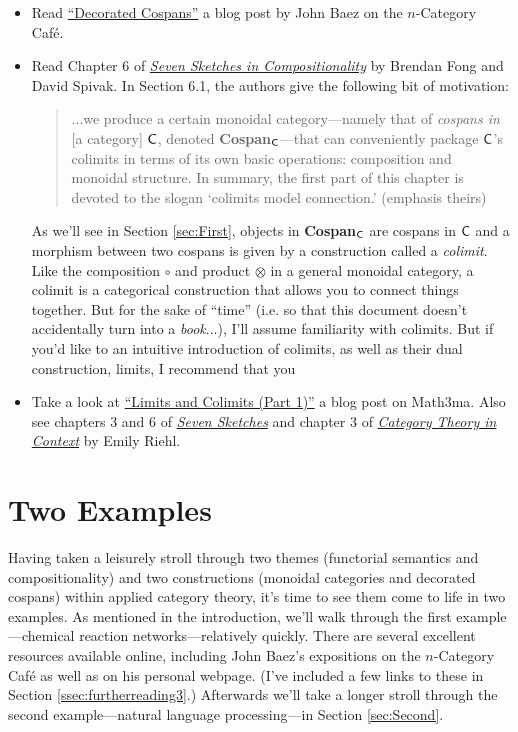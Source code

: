 \documentclass{tufte-handout-tai}
\newcommand{\cat}[1]{{\normalfont\textsf{#1}}}
\theoremstyle{plain}
\theoremstyle{definition}
\theoremstyle{remark}
\begin{document}
\begin{itemize}
	\item Read \href{https://golem.ph.utexas.edu/category/2016/01/decorated_cospans.html}{``Decorated Cospans''} a blog post by John Baez on the $n$-Category Caf{\'e}.
	\item Read Chapter 6 of \href{https://arxiv.org/pdf/1803.05316.pdf}{\textit{Seven Sketches in Compositionality}} by Brendan Fong and David Spivak. In Section 6.1, the authors give the following bit of motivation:
		\begin{quote}
		...we produce a certain monoidal category---namely that of \textit{cospans in} [a category] $\cat{C}$, denoted \textbf{Cospan}$_\cat{C}$---that can conveniently package $\cat{C}$'s colimits in terms of its own basic operations: composition and monoidal structure. In summary, the first part of this chapter is devoted to the slogan `colimits model connection.' (emphasis theirs)
		\end{quote}
	As we'll see in Section \ref{sec:First}, objects in \textbf{Cospan}$_\cat{C}$ are cospans in $\cat{C}$ and a morphism between two cospans is given by a construction called a \textit{colimit}. Like the composition $\circ$ and product $\otimes$ in a general monoidal category, a colimit is a categorical construction that allows you to connect things together. But for the sake of ``time'' (i.e. so that this document doesn't accidentally turn into a \textit{book}...), I'll assume familiarity with colimits. But if you'd like to an intuitive introduction of colimits, as well as their dual construction, limits, I recommend that you
	\item Take a look at \href{http://www.math3ma.com/mathema/2018/1/2/limits-and-colimits-part-1}{``Limits and Colimits (Part 1)''} a blog post on Math3ma. Also see chapters 3 and 6 of \href{https://arxiv.org/pdf/1803.05316.pdf}{\textit{Seven Sketches}} and chapter 3 of \href{http://www.math.jhu.edu/~eriehl/context.pdf}{\textit{Category Theory in Context}} by Emily Riehl.
\end{itemize}



\newpage
\section{Two Examples}\label{sec:Examples}
Having taken a leisurely stroll through two themes (functorial semantics and compositionality) and two constructions (monoidal categories and decorated cospans) within applied category theory, it's time to see them come to life in two examples. As mentioned in the introduction, we'll walk through the first example---chemical reaction networks---relatively quickly. There are several excellent resources available online, including John Baez's expositions on the $n$-Category Caf{\'e} as well as on his personal webpage. (I've included a few links to these in Section \ref{ssec:furtherreading3}.) Afterwards we'll take a longer stroll through the second example---natural language processing---in Section \ref{sec:Second}.
\end{document}
